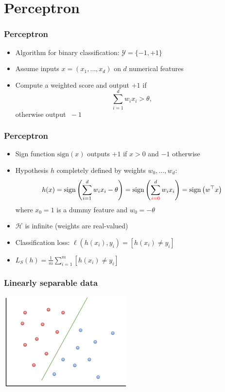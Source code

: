 \documentclass[10pt]{beamer}
\begin{document}
\section{Perceptron}

\begin{frame}
  \frametitle{Perceptron}
  \begin{itemize}
	\item Algorithm for {\color{red} binary classification}: $\mathcal{Y}=\{-1,+1\}$
	\item Assume inputs $x=(x_1,\ldots,x_d)$ on $d$ {\color{green} numerical} features
	\item Compute a {\color{blue} weighted score} and output $+1$ if
	\[\sum_{i=1}^d w_ix_i>\theta,\]
	otherwise output $\;-1$
  \end{itemize}
\end{frame}

\begin{frame}
  \frametitle{Perceptron}
  \begin{itemize}
	\item Sign function $\mathrm{sign}(x)$ outputs $+1$ if $x>0$ and $-1$ otherwise
	\item Hypothesis $h$ completely defined by {\color{green} weights} $w_0,\ldots,w_d$:
	\[h(x)=\mathrm{sign}\left(\sum_{i=1}^d w_ix_i-\theta\right)=\mathrm{sign}\left(\sum_{{\color{red} i=0}}^d w_ix_i\right)=\mathrm{sign}\left(w^\top x\right)\]
	where $x_0=1$ is a {\color{red} dummy feature} and $w_0=-\theta$
	\pause
	\item $\mathcal{H}$ is {\color{blue} infinite} (weights are real-valued)
	\item Classification loss: $\ell(h(x_i),y_i)=[h(x_i) \neq y_i]$
	\item $L_S(h) = \frac 1 m \sum_{i=1}^m [h(x_i) \neq y_i]$
  \end{itemize}
\end{frame}

\begin{frame}
  \frametitle{Linearly separable data}
  \begin{center}
  \includegraphics[height=5cm]{images/linsep.png}
  \end{center}
\end{frame}
\end{document}

